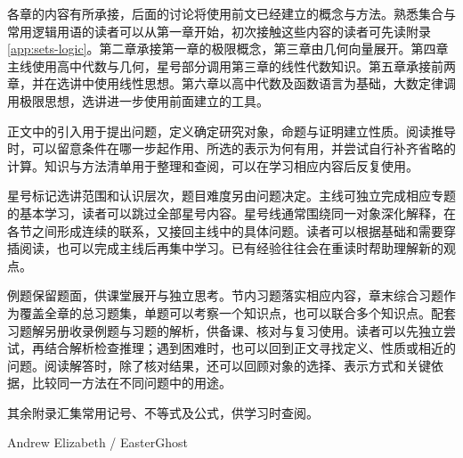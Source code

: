 各章的内容有所承接，后面的讨论将使用前文已经建立的概念与方法。熟悉集合与常用逻辑用语的读者可以从第一章开始，初次接触这些内容的读者可先读附录\ref{app:sets-logic}。第二章承接第一章的极限概念，第三章由几何向量展开。第四章主线使用高中代数与几何，星号部分调用第三章的线性代数知识。第五章承接前两章，并在选讲中使用线性思想。第六章以高中代数及函数语言为基础，大数定律调用极限思想，选讲进一步使用前面建立的工具。

正文中的引入用于提出问题，定义确定研究对象，命题与证明建立性质。阅读推导时，可以留意条件在哪一步起作用、所选的表示为何有用，并尝试自行补齐省略的计算。知识与方法清单用于整理和查阅，可以在学习相应内容后反复使用。

星号标记选讲范围和认识层次，题目难度另由问题决定。主线可独立完成相应专题的基本学习，读者可以跳过全部星号内容。星号线通常围绕同一对象深化解释，在各节之间形成连续的联系，又接回主线中的具体问题。读者可以根据基础和需要穿插阅读，也可以完成主线后再集中学习。已有经验往往会在重读时帮助理解新的观点。

例题保留题面，供课堂展开与独立思考。节内习题落实相应内容，章末综合习题作为覆盖全章的总习题集，单题可以考察一个知识点，也可以联合多个知识点。配套习题解另册收录例题与习题的解析，供备课、核对与复习使用。读者可以先独立尝试，再结合解析检查推理；遇到困难时，也可以回到正文寻找定义、性质或相近的问题。阅读解答时，除了核对结果，还可以回顾对象的选择、表示方式和关键依据，比较同一方法在不同问题中的用途。

其余附录汇集常用记号、不等式及公式，供学习时查阅。

\begin{flushright}
Andrew Elizabeth / EasterGhost\\
\lecturenotesdate
\end{flushright}
